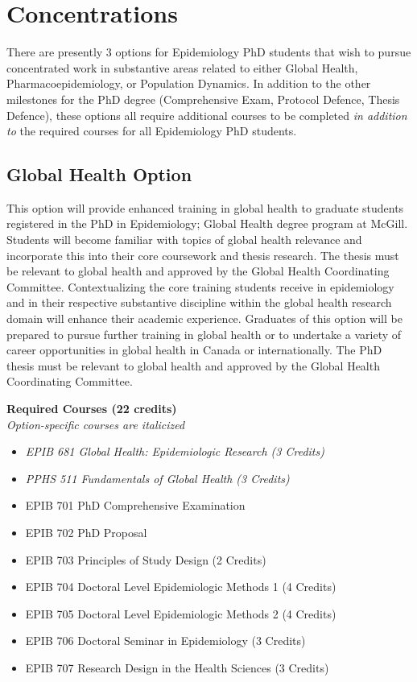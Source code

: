 \documentclass[
  openany]{book}
\providecommand{\tightlist}{%
  \setlength{\itemsep}{0pt}\setlength{\parskip}{0pt}}
\begin{document}
\hypertarget{concentrations}{%
\chapter{Concentrations}\label{concentrations}}

There are presently 3 options for Epidemiology PhD students that wish to pursue concentrated work in substantive areas related to either Global Health, Pharmacoepidemiology, or Population Dynamics. In addition to the other milestones for the PhD degree (Comprehensive Exam, Protocol Defence, Thesis Defence), these options all require additional courses to be completed \emph{in addition to} the required courses for all Epidemiology PhD students.

\hypertarget{global-health-option}{%
\section{Global Health Option}\label{global-health-option}}

This option will provide enhanced training in global health to graduate students registered in the PhD in Epidemiology; Global Health degree program at McGill. Students will become familiar with topics of global health relevance and incorporate this into their core coursework and thesis research. The thesis must be relevant to global health and approved by the Global Health Coordinating Committee. Contextualizing the core training students receive in epidemiology and in their respective substantive discipline within the global health research domain will enhance their academic experience. Graduates of this option will be prepared to pursue further training in global health or to undertake a variety of career opportunities in global health in Canada or internationally. The PhD thesis must be relevant to global health and approved by the Global Health Coordinating Committee.

\textbf{Required Courses (22 credits)}\\
\emph{Option-specific courses are italicized}

\begin{itemize}
\tightlist
\item
  \emph{EPIB 681 Global Health: Epidemiologic Research (3 Credits)}
\item
  \emph{PPHS 511 Fundamentals of Global Health (3 Credits)}
\item
  EPIB 701 PhD Comprehensive Examination
\item
  EPIB 702 PhD Proposal
\item
  EPIB 703 Principles of Study Design (2 Credits)
\item
  EPIB 704 Doctoral Level Epidemiologic Methods 1 (4 Credits)
\item
  EPIB 705 Doctoral Level Epidemiologic Methods 2 (4 Credits)
\item
  EPIB 706 Doctoral Seminar in Epidemiology (3 Credits)
\item
  EPIB 707 Research Design in the Health Sciences (3 Credits)
\end{itemize}
\end{document}

